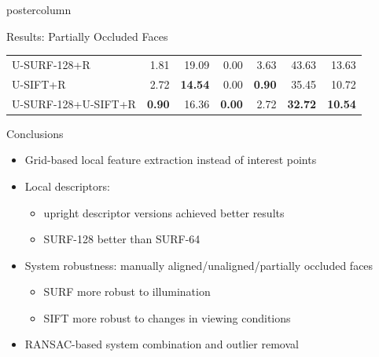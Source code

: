 \documentclass[final,hyperref={pdfpagelabels=false}]{beamer}
\begin{document}
\begin{frame}
\begin{columns}
\begin{column}{.49\textwidth}
\begin{beamercolorbox}[center,wd=\textwidth]{postercolumn}
\begin{minipage}[T]{.95\textwidth}
{\begin{block}{Results: Partially Occluded Faces}
\begin{table}
\begin{tabular}{@{} l @{} r r r r r r@{}}
                  U-SURF-128+R        & 1.81             & 19.09          & 0.00                & 3.63             & 43.63     & 13.63 \\
                  U-SIFT+R            & 2.72             & \textbf{14.54} & 0.00                & \textbf{0.90}    & 35.45     & 10.72 \\
                  U-SURF-128+U-SIFT+R &  \textbf{0.90}   & 16.36          & \textbf{0.00}       & 2.72             & \textbf{32.72} & \textbf{10.54} \\
                  \bottomrule
                \end{tabular}
              \end{table}
            \end{block}
            \vfill
            \begin{block}{Conclusions}
              \begin{itemize}
              \item Grid-based local feature extraction instead of interest points
              \item Local descriptors:
                \begin{itemize}
                \item upright descriptor versions achieved better results
                \item SURF-128 better than SURF-64
                \end{itemize}
              \item System robustness: manually aligned/unaligned/partially occluded faces
                \begin{itemize}
                \item SURF more robust to illumination
                \item SIFT more robust to changes in viewing conditions
                \end{itemize}
              \item RANSAC-based system combination and outlier removal

\end{itemize}
\end{block}}
\end{minipage}
\end{beamercolorbox}
\end{column}
\end{columns}
\end{frame}
\end{document}
